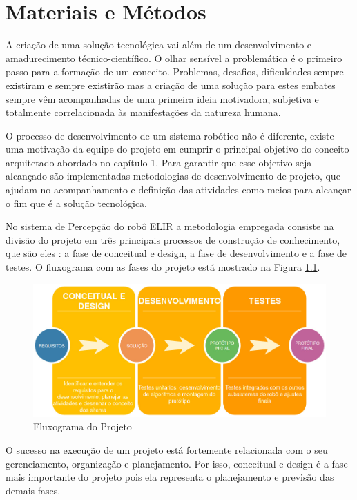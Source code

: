 \chapter{Materiais e Métodos}
\label{chap:mat}
A criação de uma solução tecnológica vai além de um desenvolvimento e amadurecimento técnico-científico. O olhar sensível a problemática é o primeiro passo para a formação de um conceito. Problemas, desafios, dificuldades sempre existiram e sempre existirão mas a criação de uma solução para estes embates sempre vêm acompanhadas de uma primeira ideia motivadora, subjetiva e totalmente correlacionada às manifestações da natureza humana.

O processo de desenvolvimento de um sistema robótico não é diferente, existe uma motivação da equipe do projeto em cumprir o principal objetivo do conceito arquitetado abordado no capítulo 1. Para garantir que esse objetivo seja alcançado são implementadas metodologias de desenvolvimento de projeto, que ajudam no acompanhamento e definição das atividades como meios para alcançar o fim que é a solução tecnológica.

No sistema de Percepção do robô ELIR a metodologia empregada consiste na divisão do projeto em três principais processos de construção de conhecimento, que são eles : a fase de conceitual e design, a fase de desenvolvimento e a fase de testes. O fluxograma com as fases do projeto está mostrado na Figura \ref{Fig:flux_proj}.

\begin{figure}[h]
	\centering
	\includegraphics[width=16cm]{Figures/diagrama_proj.jpg}
	\caption{Fluxograma do Projeto}
	\label{Fig:flux_proj}
\end{figure}

O sucesso na execução de um projeto está fortemente relacionada com o seu gerenciamento, organização e planejamento. Por isso, conceitual e design é a fase mais importante do projeto pois ela representa o planejamento e previsão das demais fases. 

